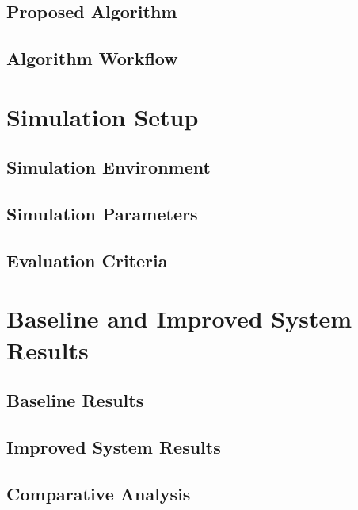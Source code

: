 \documentclass[12pt]{report}
\begin{document}
\section{Proposed Algorithm}

\section{Algorithm Workflow}

\chapter{Simulation Setup}

\section{Simulation Environment}

\section{Simulation Parameters}

\section{Evaluation Criteria}

\chapter{Baseline and Improved System Results}

\section{Baseline Results}

\section{Improved System Results}

\section{Comparative Analysis}
\end{document}
